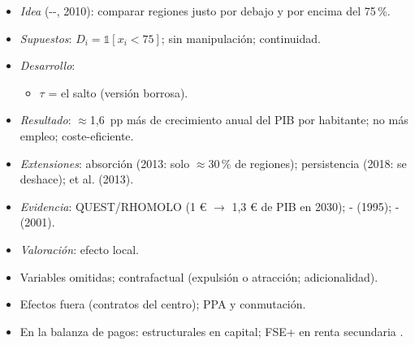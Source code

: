 \documentclass{article}
\begin{document}
\begin{columnas}
\begin{itemize}
\item \emph{Idea} (--, 2010): comparar regiones justo por debajo y por encima del 75\,\%.
\item \emph{Supuestos}: $D_i=\mathbb 1[x_i<75]$; sin manipulación; continuidad.
\item \emph{Desarrollo}:
  \begin{itemize}
  \item $\tau$ = el salto (versión borrosa).
  \end{itemize}
\item \emph{Resultado}: $\approx$1,6~pp más de crecimiento anual del PIB por habitante; no más empleo; coste-eficiente.
\item \emph{Extensiones}: absorción (2013: solo $\approx$30\,\% de regiones); persistencia (2018: se deshace);  et al. (2013).
\item \emph{Evidencia}: QUEST/RHOMOLO (1 € $\to$ 1,3 € de PIB en 2030); - (1995); - (2001).
\item \emph{Valoración}: efecto local.
\end{itemize}

\begin{itemize}
\item Variables omitidas; contrafactual (expulsión o atracción; adicionalidad).
\item Efectos fuera (contratos del centro); PPA y conmutación.
\item En la balanza de pagos: estructurales en capital; FSE+ en renta secundaria .
\end{itemize}


\end{columnas}
\end{document}
